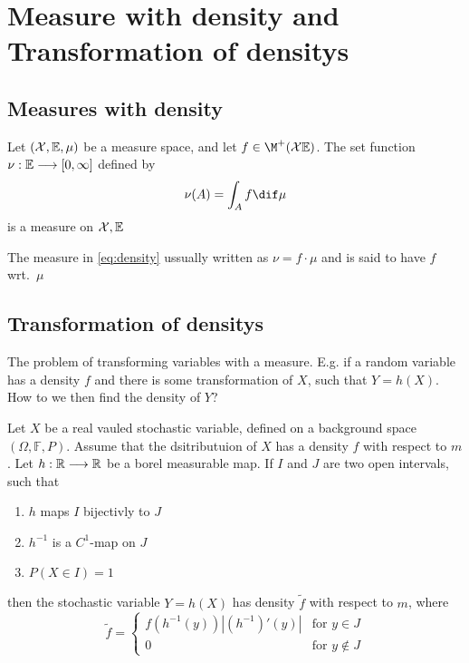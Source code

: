 \section[Lecture 6]{Measure with density and Transformation of densitys} %
\subsection{Measures with density} %
\label{sub:measures_with_density}
\begin{lem}
Let \(({\mathcal{X}},{\mathbb{E}},\mu)\) be a measure space, and let \(f\in\M^+(\X\E)\). The set function \(\nu:{\mathbb{E}} \longrightarrow [0,\infty]\) defined by
\begin{align}
\nu(A)=\int_A f\dif \mu \label{eq:density}
\end{align}
is a measure on \({\mathcal{X}},{\mathbb{E}}\)
\end{lem}
\begin{rem}
The measure in \cref{eq:density} ussually written as \(\nu=f\cdot \mu\) and is said to have  \(f\) wrt.\  \(\mu\)
\end{rem}

\subsection{Transformation of densitys} %
\label{sub:transformation_of_densitys}
The problem of transforming variables with a measure. E.g. if a random variable has a density \(f\) and there is some transformation of \(X\), such that \(Y=h(X)\). How to we then find the density of \(Y\)?
\label{sec:transformation_of_densitys}
\begin{them}
 	Let \(X\) be a real vauled stochastic variable, defined on a background space \((\Omega,\mathbb{F},P)\). Assume that the dsitributuion of \(X\) has a density \(f\) with respect to \(m\). Let \(h:{\mathbb{R}} \longrightarrow{\mathbb{R}}\) be a borel measurable map. If \(I\) and \(J\) are two open intervals, such that
 	\begin{enumerate}
 	  	\item \(h\) maps \(I\) bijectivly to \(J\)
 	  	\item \(h^{-1}\) is a \(C^1\)-map on \(J\)
 	  	\item \(P(X\in I)=1\)
 	\end{enumerate}
 	then the stochastic variable \(Y=h(X)\) has density \(\tilde{f}\) with respect to \(m\), where
 	\[
 		\tilde{f}=
 				\begin{cases}
 		    		f\left(h^{-1}(y)\right)\left|\left(h^{-1}\right)'(y)\right| &\text{for } y\in J \\
 		    		0 & \text{for } y\notin J
 				\end{cases}
 	\]
\end{them}

